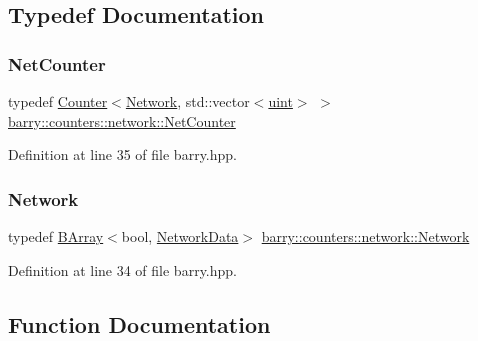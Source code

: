 \subsection{Typedef Documentation}
\mbox{\label{namespacebarry_1_1counters_1_1network_a2d14cbc0a77bfba218df85a750bfeb84}} 
\subsubsection{\texorpdfstring{Net\+Counter}{NetCounter}}
{\footnotesize\ttfamily typedef \hyperlink{classbarry_1_1_counter}{Counter}$<$\hyperlink{namespacebarry_1_1counters_1_1network_a4cb88d4572ded3b447ea269c9cd0b2c0}{Network}, std\+::vector$<$\hyperlink{namespacebarry_a11dfc53ddb4672278319aa04f1e09a6c}{uint}$>$ $>$ \hyperlink{namespacebarry_1_1counters_1_1network_a2d14cbc0a77bfba218df85a750bfeb84}{barry\+::counters\+::network\+::\+Net\+Counter}}



Definition at line 35 of file barry.\+hpp.

\mbox{\label{namespacebarry_1_1counters_1_1network_a4cb88d4572ded3b447ea269c9cd0b2c0}} 
\subsubsection{\texorpdfstring{Network}{Network}}
{\footnotesize\ttfamily typedef \hyperlink{classbarry_1_1_b_array}{B\+Array}$<$bool, \hyperlink{classbarry_1_1counters_1_1network_1_1_network_data}{Network\+Data}$>$ \hyperlink{namespacebarry_1_1counters_1_1network_a4cb88d4572ded3b447ea269c9cd0b2c0}{barry\+::counters\+::network\+::\+Network}}



Definition at line 34 of file barry.\+hpp.



\subsection{Function Documentation}
\mbox{\label{namespacebarry_1_1counters_1_1network_ac6c1b51aacfe3a6c0df270ec606197b6}} 
